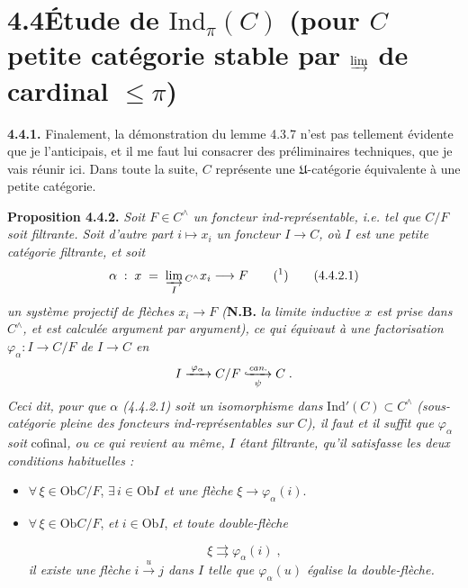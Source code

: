 \documentclass[11pt]{article}
\newcommand{\printedpage}[1]{\marginpar{\footnotesize p.~#1}}
\newcommand{\msp}[1]{\marginpar{\footnotesize [#1]}}
\newcommand{\Ind}{\mathrm{Ind}}
\newcommand{\Ob}{\mathrm{Ob}}
\newcommand{\hookxrightarrow}[2][]{\lhook\joinrel\xrightarrow[#1]{#2}}
\begin{document}
\msp{page 79}

\section*{4.4\quad Étude de $\Ind_\pi(C)$ (pour $C$ petite catégorie stable par $\varinjlim$ de cardinal $\leqslant \pi$)}

\textbf{4.4.1.} Finalement, la démonstration du lemme 4.3.7 n'est pas tellement évidente que je l'anticipais, et il me faut lui consacrer des préliminaires techniques, que je vais réunir ici. Dans toute la suite, $C$ représente une $\mathfrak{U}$-catégorie équivalente à une petite catégorie.

\printedpage{16}

\textbf{Proposition 4.4.2.} \textit{Soit $F \in C^{\wedge}$ un foncteur ind-représentable, i.e. tel que $C/F$ soit filtrante. Soit d'autre part $i \longmapsto x_i$ un foncteur $I \longrightarrow C$, où $I$ est une petite catégorie filtrante, et soit}
\[
\alpha \;:\; x \;=\; \varinjlim_{I}{}_{C^{\wedge}} x_i \longrightarrow F \qquad \text{(\footnotemark)} \tag*{(4.4.2.1)}
\]
\textit{un système projectif de flèches $x_i \longrightarrow F$ (}\textbf{N.B.} \textit{la limite inductive $x$ est prise dans $C^{\wedge}$, et est calculée argument par argument), ce qui équivaut à une factorisation $\varphi_\alpha : I \longrightarrow C/F$ de $I \longrightarrow C$ en}
\[
I \xrightarrow{\;\varphi_\alpha\;} C/F \hookxrightarrow[\psi]{\textit{can.}} C \;.
\]
\textit{Ceci dit, pour que $\alpha$ (4.4.2.1) soit un isomorphisme dans} $\Ind'(C) \subset C^{\wedge}$ \textit{(sous-catégorie pleine des foncteurs ind-représentables sur $C$), il faut et il suffit que $\varphi_\alpha$ soit} cofinal\textit{, ou ce qui revient au même, $I$ étant filtrante, qu'il satisfasse les deux conditions habituelles :}
\begin{itemize}[leftmargin=2.5em]
\item[F\,1)] $\forall\, \xi \in \Ob C/F$, $\exists\, i \in \Ob I$ \textit{et une flèche} $\xi \longrightarrow \varphi_\alpha(i)$.
\item[F\,2)] $\forall\, \xi \in \Ob C/F$, \textit{et} $i \in \Ob I$, \textit{et toute double-flèche}

\msp{page 80}
\[
\xi \rightrightarrows \varphi_\alpha(i) \;,
\]
\textit{il existe une flèche $i \xrightarrow{\;u\;} j$ dans $I$ telle que $\varphi_\alpha(u)$ égalise la double-flèche.}
\end{itemize}
\end{document}
